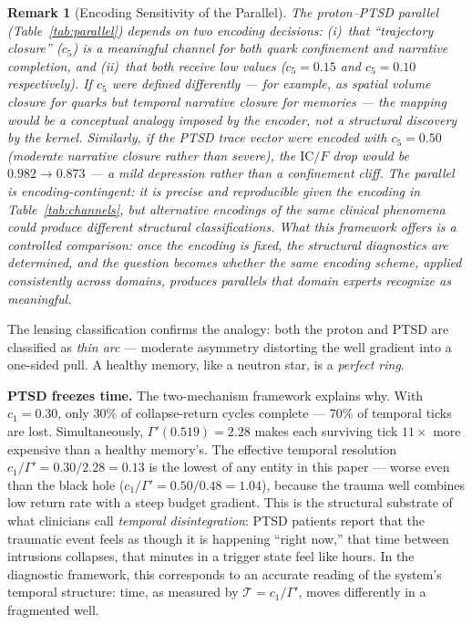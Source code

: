 \documentclass[
  aps,
  prd,
  twocolumn,
  superscriptaddress,
  nofootinbib,
  floatfix
]{revtex4-2}
\newtheorem{remark}{Remark}
\newcommand{\Gam}{\Gamma}
\newcommand{\IC}{\mathrm{IC}}
\begin{document}
\begin{remark}[Encoding Sensitivity of the Parallel]
\label{rem:parallel}
The proton--PTSD parallel (Table~\ref{tab:parallel})
depends on two encoding decisions: (i)~that ``trajectory
closure'' ($c_5$) is a meaningful channel for both quark
confinement and narrative completion, and (ii)~that both
receive low values ($c_5 = 0.15$ and $c_5 = 0.10$
respectively).  If $c_5$ were defined differently --- for
example, as spatial volume closure for quarks but temporal
narrative closure for memories --- the mapping would be a
\emph{conceptual analogy imposed by the encoder}, not a
structural discovery by the kernel.  Similarly, if the PTSD
trace vector were encoded with $c_5 = 0.50$ (moderate
narrative closure rather than severe), the $\IC/F$ drop
would be $0.982 \to 0.873$ --- a mild depression rather
than a confinement cliff.  The parallel is
\emph{encoding-contingent}: it is precise and reproducible
given the encoding in Table~\ref{tab:channels}, but
alternative encodings of the same clinical phenomena could
produce different structural classifications.  What this
framework offers is a \emph{controlled comparison}: once
the encoding is fixed, the structural diagnostics are
determined, and the question becomes whether the same
encoding scheme, applied consistently across domains,
produces parallels that domain experts recognize as
meaningful.
\end{remark}

The lensing classification confirms the analogy: both the
proton and PTSD are classified as \emph{thin arc} ---
moderate asymmetry distorting the well gradient into a
one-sided pull.  A healthy memory, like a neutron star, is
a \emph{perfect ring}.

\textbf{PTSD freezes time.}
The two-mechanism framework explains why.  With $c_1 = 0.30$,
only $30\%$ of collapse-return cycles complete --- $70\%$ of
temporal ticks are lost.  Simultaneously, $\Gam'(0.519) =
2.28$ makes each surviving tick $11\times$ more expensive than
a healthy memory's.  The effective temporal resolution
$c_1/\Gam' = 0.30/2.28 = 0.13$ is the lowest of any
entity in this paper --- worse even than the black hole
($c_1/\Gam' = 0.50/0.48 = 1.04$), because the trauma well
combines low return rate with a steep budget gradient.  This is the structural substrate of what
clinicians call \emph{temporal disintegration}: PTSD patients
report that the traumatic event feels as though it is
happening ``right now,'' that time between intrusions
collapses, that minutes in a trigger state feel like hours.
In the diagnostic framework, this corresponds to an
accurate reading of the system's temporal structure:
time, as measured by $\mathcal{T} = c_1/\Gam'$,
moves differently in a fragmented well.
\end{document}
